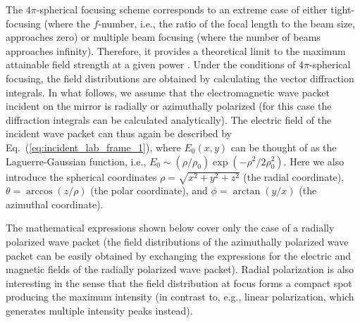 \documentclass[10pt, a4paper, twoside, openright]{report}
\begin{document}
The $ 4 \pi $-spherical focusing scheme corresponds to an extreme case of either tight-focusing (where the $ f $-number, i.e., the ratio of the focal length to the beam size, approaches zero) or multiple beam focusing (where the number of beams approaches infinity). Therefore, it provides a theoretical limit to the maximum attainable field strength at a given power \cite{Jeong2020}. Under the conditions of $ 4 \pi $-spherical focusing, the field distributions are obtained by calculating the vector diffraction integrals. In what follows, we assume that the electromagnetic wave packet incident on the mirror is radially or azimuthally polarized (for this case the diffraction integrals can be calculated analytically). The electric field of the incident wave packet can thus again be described by Eq.~(\ref{eq:incident_lab_frame_1}), where $ E_0 \left(x, y \right) $ can be thought of as the Laguerre-Gaussian function, i.e., $ E_0 \sim \left( \rho / \rho_0 \right)\exp \left( - \rho^2 / 2 \rho_0^2 \right)$. Here we also introduce the spherical coordinates $ \rho = \sqrt{x^2 + y^2 + z^2} $ (the radial coordinate), $ \theta = \arccos \left( z / \rho \right)$ (the polar coordinate), and $ \phi = \arctan \left( y / x \right)$ (the azimuthal coordinate).

The mathematical expressions shown below cover only the case of a radially polarized wave packet (the field distributions of the azimuthally polarized wave packet can be easily obtained by exchanging the expressions for the electric and magnetic fields of the radially polarized wave packet). Radial polarization is also interesting in the sense that the field distribution at focus forms a compact spot producing the maximum intensity (in contrast to, e.g., linear polarization, which generates multiple intensity peaks instead).
\end{document}
